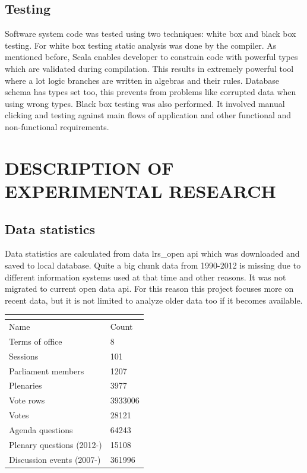 \documentclass[a4paper,12pt]{article}
\begin{document}
 	\subsection{Testing}
 	
 	Software system code was tested using two techniques: white box and black box testing. For white box testing static analysis was done by the compiler. As mentioned before, Scala enables developer to constrain code with powerful types which are validated during compilation. This results in extremely powerful tool where a lot logic branches are written in algebras and their rules. Database schema has types set too, this prevents from problems like corrupted data when using wrong types. Black box testing was also performed. It involved manual clicking and testing against main flows of application and other functional and non-functional requirements. 
 	
 	
	\clearpage
	
	\section{DESCRIPTION OF EXPERIMENTAL RESEARCH}
	\subsection{Data statistics}
	
	Data statistics are calculated from data \gls{lrs_open} \acrshort{api} which was downloaded and saved to local database. Quite a big chunk data from 1990-2012 is missing due to different information systems used at that time and other reasons. It was not migrated to current open data \acrshort{api}. For this reason this project focuses more on recent data, but it is not limited to analyze older data too if it becomes available.
	
	\noindent
	\begin{center}
		\begin{tabular}{L{5cm} R{3cm}}
			\\ 
			\hline
			Name & Count \\\hline
			Terms of office & 8\\
			Sessions & 101\\
			Parliament members & 1207\\
			Plenaries & 3977\\
			Vote rows & 3933006\\
			Votes & 28121\\
			Agenda questions & 64243\\
			Plenary questions (2012-) & 15108\\
			Discussion events (2007-) & 361996\\
			\hline
		\end{tabular} \label{tab:data_statistics}
	\end{center}
	
\end{document}
